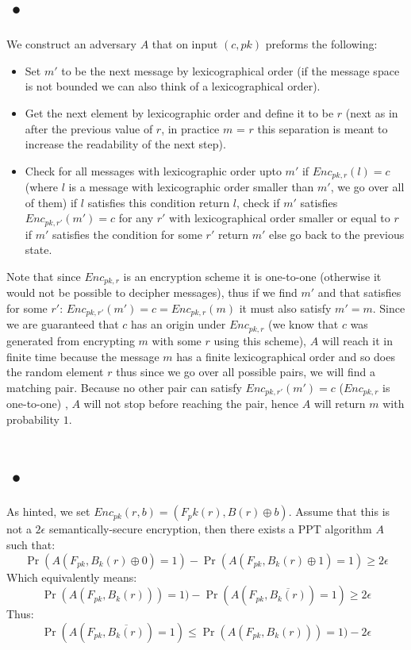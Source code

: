 \documentclass{article}
\begin{document}
\section{•}
We construct an adversary $A$ that on input $(c, pk)$ preforms the following:
\begin{itemize}
\item Set $m'$ to be the next message by lexicographical order (if the message space is not bounded we can also think of a lexicographical order).
\item Get the next element by lexicographic order and define it to be $r$ (next as in after the previous value of $r$, in practice $m$ = $r$ this separation is meant to increase the readability of the next step).
\item Check for all messages with lexicographic order upto $m'$ if $Enc_{pk, r}(l) = c$ (where $l$ is a message with lexicographic order smaller than $m'$, we go over all of them) if $l$ satisfies this condition return  $l$, check if $m'$ satisfies   $Enc_{pk, r'}(m') = c$ for any $r'$ with lexicographical order smaller or equal to $r$ if $m'$ satisfies the condition for some $r'$ return $m'$ else go back to the previous state.
\end{itemize}

Note that since $Enc_{pk,r}$ is an encryption scheme it is one-to-one (otherwise it would not be possible to decipher messages), thus if we find $m'$  and that satisfies for some $r'$: $Enc_{pk,r'}(m') = c = Enc_{pk,r}(m)$ it must also satisfy  $m' =m$. Since we are guaranteed that $c$ has an origin under $Enc_{pk, r}$ (we know that $c$ was generated from encrypting $m$ with some $r$ using this scheme), $A$ will reach it in finite time because the message $m$ has a finite lexicographical order and so does the random element $r$ thus since we go over all possible pairs, we will find a matching pair. Because no other pair can satisfy  $Enc_{pk, r'}(m') = c$  ($Enc_{pk, r}$ is one-to-one) , $A$ will not stop before reaching the pair, hence $A$ will return $m$ with probability $1$.

\section{•}
As hinted, we set $Enc_{pk}(r, b) = (F_pk(r) , B(r) \oplus b)$.
Assume that this is not a $2\epsilon$ semantically-secure encryption, then there exists a PPT algorithm $A$ such that:
\[\Pr(A(F_{pk}, B_k(r)\oplus 0) = 1) -  \Pr(A(F_{pk}, B_k(r)\oplus 1) = 1) \geq 2\epsilon \]
Which equivalently means:
\[\Pr(A(F_{pk}, B_k(r)) ) = 1) -  \Pr(A(F_{pk}, \overline{B_k(r)}) = 1) \geq  2\epsilon \]
Thus:
\[\Pr(A(F_{pk}, \overline{B_k(r)}) = 1) \leq \Pr(A(F_{pk}, B_k(r)) ) = 1) - 2\epsilon \]
\end{document}
